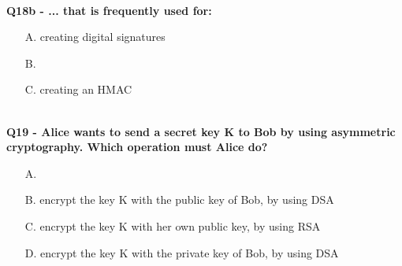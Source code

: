 \textbf{\\Q18b - ... that is frequently used for:}
\begin{enumerate}
    \item[A.] creating digital signatures
    \item[B.] 
    \item[C.] creating an HMAC
\end{enumerate}

\textbf{\\Q19 - Alice wants to send a secret key K to Bob by using asymmetric cryptography. Which operation must Alice do?}
\begin{enumerate}
    \item[A.] 
    \item[B.] encrypt the key K with the public key of Bob, by using DSA
    \item[C.] encrypt the key K with her own public key, by using RSA
    \item[D.] encrypt the key K with the private key of Bob, by using DSA
\end{enumerate}

